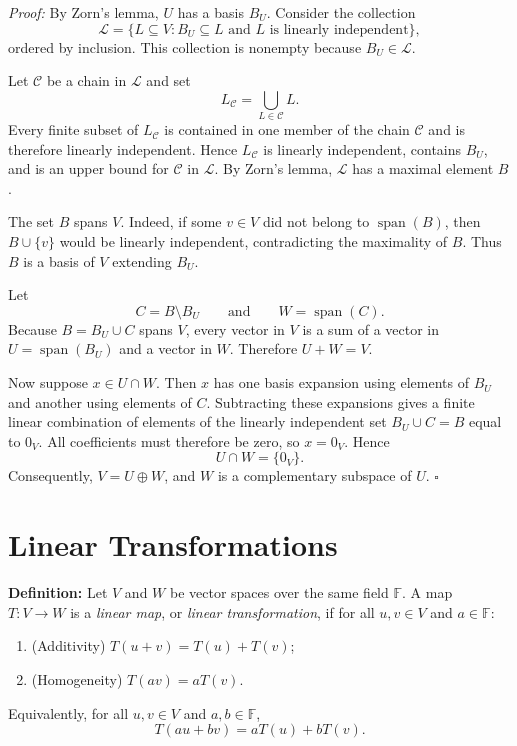 \documentclass[a4paper,11pt,abstract=true]{scrartcl}
\theoremstyle{dotlessP}
\theoremstyle{dotlessS}
\theoremstyle{remark}
\theoremstyle{definition}
\begin{document}
\begin{claim_box}
\textit{Proof:} By Zorn's lemma, $U$ has a basis $B_U$. Consider the
collection
\[
\mathcal{L}
=\{L\subseteq V:B_U\subseteq L\text{ and }L\text{ is linearly independent}\},
\]
ordered by inclusion. This collection is nonempty because $B_U\in\mathcal{L}$.

Let $\mathcal{C}$ be a chain in $\mathcal{L}$ and set
\[
L_{\mathcal{C}}=\bigcup_{L\in\mathcal{C}}L.
\]
Every finite subset of $L_{\mathcal{C}}$ is contained in one member of the
chain $\mathcal{C}$ and is therefore linearly independent. Hence
$L_{\mathcal{C}}$ is linearly independent, contains $B_U$, and is an upper
bound for $\mathcal{C}$ in $\mathcal{L}$. By Zorn's lemma, $\mathcal{L}$ has
a maximal element $B$.

The set $B$ spans $V$. Indeed, if some $v\in V$ did not belong to
$\operatorname{span}(B)$, then $B\cup\{v\}$ would be linearly independent,
contradicting the maximality of $B$. Thus $B$ is a basis of $V$ extending
$B_U$.

Let
\[
C=B\setminus B_U
\qquad\text{and}\qquad
W=\operatorname{span}(C).
\]
Because $B=B_U\cup C$ spans $V$, every vector in $V$ is a sum of a vector in
$U=\operatorname{span}(B_U)$ and a vector in $W$. Therefore $U+W=V$.

Now suppose $x\in U\cap W$. Then $x$ has one basis expansion using elements
of $B_U$ and another using elements of $C$. Subtracting these expansions
gives a finite linear combination of elements of the linearly independent set
$B_U\cup C=B$ equal to $0_V$. All coefficients must therefore be zero, so
$x=0_V$. Hence
\[
U\cap W=\{0_V\}.
\]
Consequently, $V=U\oplus W$, and $W$ is a complementary subspace of $U$.
\hfill$\square$
\end{claim_box}


\section{Linear Transformations}

\begin{definition_box}
\textbf{Definition:} Let $V$ and $W$ be vector spaces over the same
field $\mathbb{F}$. A map $T:V\longrightarrow W$ is a \emph{linear map},
or \emph{linear transformation}, if for all $u,v\in V$ and
$a\in\mathbb{F}$:
\begin{enumerate}
    \item (Additivity) $T(u+v)=T(u)+T(v)$;
    \item (Homogeneity) $T(av)=aT(v)$.
\end{enumerate}
Equivalently, for all $u,v\in V$ and $a,b\in\mathbb{F}$,
\[
T(au+bv)=aT(u)+bT(v).
\]
\end{definition_box}
\end{document}
